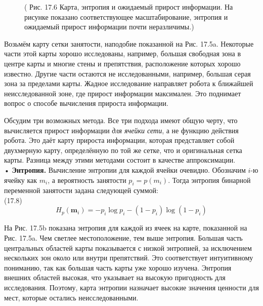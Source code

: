 \documentclass[10pt,a4paper]{article}
\begin{document}
\begin{figure}[H]
	\caption{ ( Рис. 17.6 Карта, энтропия и ожидаемый прирост информации.  На рисунке показано соответствующее масштабирование, энтропия и ожидаемый прирост информации почти неразличимы.) }
	\label{fig:176orig}
\end{figure}

Возьмём карту сетки занятости, наподобие показанной на Рис. 17.5a. Некоторые части этой карты хорошо исследованы, например, большая свободная зона в центре карты и многие стены и препятствия, расположение которых хорошо известно. Другие части остаются не исследованными, например, большая серая зона за пределами карты. Жадное исследование направляет робота к ближайшей неисследованной зоне, где прирост информации максимален. Это поднимает вопрос о способе вычисления прироста информации. 

Обсудим три возможных метода. Все три подхода имеют общую черту, что вычисляется прирост информации \textit{для ячейки сети}, а не функцию действия робота. Это даёт карту прироста информации, которая представляет собой двухмерную карту, определённую по той же сетке, что и оригинальная сетка карты. Разница между этими методами состоит в качестве аппроксимации.\\

•\textbf{	Энтропия.} Вычисление энтропии для каждой ячейки очевидно. Обозначим $i$-ю ячейку как $m_i$, а вероятность занятости $p_i = p(m_i)$. Тогда энтропия бинарной переменной занятости задана следующей суммой:\\

(17.8)
$$H_p(\textbf{m}_i)=-p_i\log p_i-(1-p_i)\log(1-p_i)$$

На Рис. 17.5b показана энтропия для каждой из ячеек на карте, показанной на Рис. 17.5a. Чем светлее местоположение, тем выше энтропия. Большая часть центральных областей карты показывается с низкой энтропией, за исключением нескольких зон около или внутри препятствий. Это соответствует интуитивному пониманию, так как большая часть карты уже хорошо изучена. Энтропия внешних областей высокая, что указывает на высокую пригодность для исследования. Поэтому, карта энтропии назначает высокие значения ценности для мест, которые остались неисследованными.\\
\end{document}

